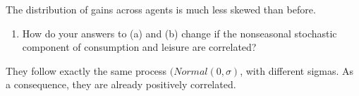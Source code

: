 \documentclass[11pt]{article}
\providecommand{\tightlist}{%
      \setlength{\itemsep}{0pt}\setlength{\parskip}{0pt}}
\begin{document}
    The distribution of gains across agents is much less skewed than before.

\begin{enumerate}
\def\labelenumi{(\alph{enumi})}
\setcounter{enumi}{2}
\tightlist
\item
  How do your answers to (a) and (b) change if the nonseasonal
  stochastic component of consumption and leisure are correlated?
\end{enumerate}

They follow exactly the same process \((Normal (0, \sigma)\), with
different sigmas. As a consequence, they are already positively
correlated.


    
    
    
    
\end{document}
